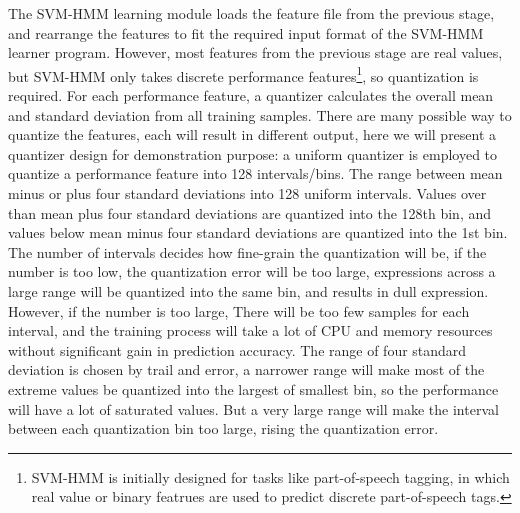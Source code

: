 The SVM-HMM learning module loads the feature file from the previous stage, and rearrange the features to fit the required input format of the SVM-HMM learner program. However, most features from the previous stage are real values, but SVM-HMM only takes discrete performance features\footnote{SVM-HMM is initially designed for tasks like part-of-speech tagging, in which real value or binary featrues are used to predict discrete part-of-speech tags.}, so quantization is required. For each performance feature, a quantizer calculates the overall mean and standard deviation from all training samples. There are many possible way to quantize the features, each will result in different output, here we will present a quantizer design for demonstration purpose: a uniform quantizer is employed to quantize a performance feature into 128 intervals/bins. The range between mean minus or plus four standard deviations into 128 uniform intervals. Values over than mean plus four standard deviations are quantized into the 128th bin, and values below mean minus four standard deviations are quantized into the 1st bin.  The number of intervals decides how fine-grain the quantization will be, if the number is too low, the quantization error will be too large, expressions across a large range will be quantized into the same bin, and results in dull expression. However, if the number is too large, There will be too few samples for each interval, and the training process will take a lot of CPU and memory resources without significant gain in prediction accuracy. The range of four standard deviation is chosen by trail and error, a narrower range will make most of the extreme values be quantized into the largest of smallest bin, so the performance will have a lot of saturated values. But a very large range will make the interval between each quantization bin too large, rising the quantization error. %

